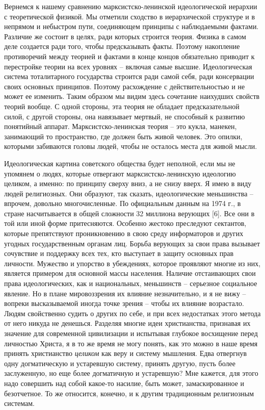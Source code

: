 \documentclass{book}
\begin{document}
Вернемся к нашему сравнению марксистско-ленинской идеологической иерархии с теоретической физикой. Мы отме­тили сходство в 
иерархической структуре и в непрямом и не­быстром пути, соединяющем принципы с наблюдаемыми фак­тами. Различие же состоит в целях, 
ради которых строится теория. Физика в самом деле создается ради того, чтобы пред­сказывать факты. Поэтому накопление 
противоречий между теорией и фактами в конце концов обязательно приводит к пе­рестройке теории на всех уровнях -- включая самые 
высшие. Идеологическая система тоталитарного государства строится ради самой себя, ради консервации своих основных принци­пов. 
Поэтому расхождение с действительностью и не может ее изменить. Таким образом мы видим здесь сочетание наихуд­ших свойств теорий 
вообще. С одной стороны, эта теория не обладает предсказательной силой, с другой стороны, она навя­зывает мертвый, не способный к 
развитию понятийный аппа­рат. Марксистско-ленинская теория -- это кукла, манекен, занимающий то пространство, где должен быть 
живой человек. Это опилки, которыми забиваются головы людей, чтобы не осталось места для живой мысли.

Идеологическая картина советского общества будет непол­ной, если мы не упомянем о людях, которые отвергают марксистско-ленинскую 
идеологию целиком, а именно: по принци­пу сверху вниз, а не снизу вверх. Я имею в виду людей религи­озных. Они образуют, так 
сказать, идеологические меньшинст­ва -- впрочем, довольно многочисленные. По официальным данным на 1974 г., в стране 
насчитывается в общей сложно­сти 32 миллиона верующих [6]. Все они в той или иной форме притесняются. Особенно жестоко преследуют 
сектантов, кото­рые препятствуют проникновению в свою среду информато­ров и других угодных государственным органам лиц. Борьба 
верующих за свои права вызывает сочувствие и поддержку всех тех, кто выступает в защиту основных прав личности. Мужество и 
упорство в убеждениях, которое проявляют мно­гие из них, является примером для основной массы населения. Наличие отстаивающих 
свои права идеологических, как и на­циональных, меньшинств -- серьезное социальное явление. Но в плане мировоззрения их влияние 
незначительно, и я не вижу -- вопреки высказываемой иногда точке зрения -- чтобы их влияние возрастало. Людям свойственно судить 
о других по себе, и при всех недостатках этого метода от него никуда не денешься. Разделяя многие идеи христианства, признавая 
их значение для современной цивилизации и испытывая глубокое восхищение перед личностью Христа, я в то же время не могу по­нять, 
как это можно в наше время принять христианство \textit{цели­ком} как веру и систему мышления. Едва отвергнув одну догма­тическую 
и устаревшую систему, принять другую, пусть более заслуженную, но еще более догматичную и устаревшую? Мне кажется, для этого 
надо совершить над собой какое-то наси­лие, быть может, замаскированное и безотчетное. То же относится, конечно, и к другим 
традиционным религиозным системам.
\end{document}
